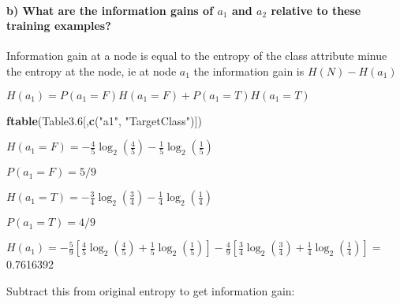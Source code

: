 \documentclass[]{article}
\newenvironment{Shaded}{\begin{snugshade}}{\end{snugshade}}
\newcommand{\FloatTok}[1]{\textcolor[rgb]{0.00,0.00,0.81}{#1}}
\newcommand{\KeywordTok}[1]{\textcolor[rgb]{0.13,0.29,0.53}{\textbf{#1}}}
\newcommand{\NormalTok}[1]{#1}
\newcommand{\StringTok}[1]{\textcolor[rgb]{0.31,0.60,0.02}{#1}}
\let\oldparagraph\paragraph
\renewcommand{\paragraph}[1]{\oldparagraph{#1}\mbox{}}
\begin{document}
\hypertarget{b-what-are-the-information-gains-of-a_1-and-a_2-relative-to-these-training-examples}{%
\paragraph{\texorpdfstring{b) What are the information gains of \(a_1\)
and \(a_2\) relative to these training
examples?}{b) What are the information gains of a\_1 and a\_2 relative to these training examples?}}\label{b-what-are-the-information-gains-of-a_1-and-a_2-relative-to-these-training-examples}}

Information gain at a node is equal to the entropy of the class
attribute minue the entropy at the node, ie at node \(a_1\) the
information gain is \(H(N)-H(a_1)\)

\(H(a_1) = P(a_1 = F)H(a_1=F)+P(a_1=T)H(a_1=T)\)

\begin{Shaded}
\begin{Highlighting}[]
\KeywordTok{ftable}\NormalTok{(Table3}\FloatTok{.6}\NormalTok{[,}\KeywordTok{c}\NormalTok{(}\StringTok{"a1"}\NormalTok{, }\StringTok{"TargetClass"}\NormalTok{)])}
\end{Highlighting}
\end{Shaded}

\(H(a_1 = F) = -\frac{4}{5}\log_2\left(\frac{4}{5}\right)-\frac{1}{5}\log_2\left(\frac{1}{5}\right)\)

\(P(a_1 = F) = 5/9\)

\(H(a_1 = T) = -\frac{3}{4}\log_2\left(\frac{3}{4}\right) - \frac{1}{4}\log_2\left(\frac{1}{4}\right)\)

\(P(a_1 = T) = 4/9\)

\(H(a_1) = -\frac{5}{9}\left[\frac{4}{5}\log_2\left(\frac{4}{5}\right)+\frac{1}{5}\log_2\left(\frac{1}{5}\right)\right] -\frac{4}{9}\left[\frac{3}{4}\log_2\left(\frac{3}{4}\right) + \frac{1}{4}\log_2\left(\frac{1}{4}\right)\right] =\)
0.7616392

Subtract this from original entropy to get information gain:
\end{document}
